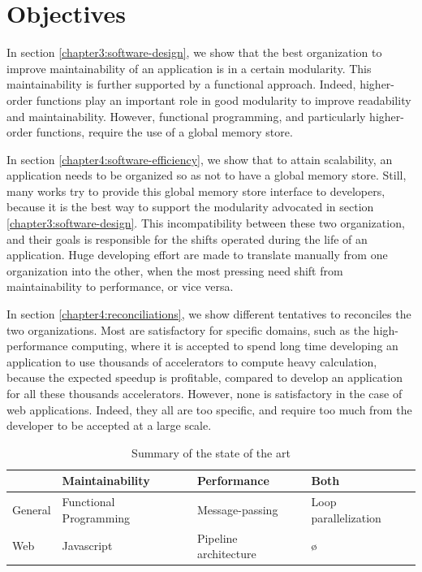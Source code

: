 \section{Objectives}


In section \ref{chapter3:software-design}, we show that the best organization to improve maintainability of an application is in a certain modularity.
This maintainability is further supported by a functional approach.
Indeed, higher-order functions play an important role in good modularity to improve readability and maintainability.
However, functional programming, and particularly higher-order functions, require the use of a global memory store.

In section \ref{chapter4:software-efficiency}, we show that to attain scalability, an application needs to be organized so as not to have a global memory store.
Still, many works try to provide this global memory store interface to developers, because it is the best way to support the modularity advocated in section \ref{chapter3:software-design}.
This incompatibility between these two organization, and their goals is responsible for the shifts operated during the life of an application.
Huge developing effort are made to translate manually from one organization into the other, when the most pressing need shift from maintainability to performance, or vice versa.

In section \ref{chapter4:reconciliations}, we show different tentatives to reconciles the two organizations.
Most are satisfactory for specific domains, such as the high-performance computing, where it is accepted to spend long time developing an application to use thousands of accelerators to compute heavy calculation, because the expected speedup is profitable, compared to develop an application for all these thousands accelerators.
However, none is satisfactory in the case of web applications.
Indeed, they all are too specific, and require too much from the developer to be accepted at a large scale.


\begin{table}
\begin{tabular}{l|l|l|l}
             & Maintainability         & Performance           & Both\\\hline
General      & Functional Programming  & Message-passing       & Loop parallelization\\
Web          & Javascript              & Pipeline architecture & ø
\end{tabular}
\caption{Summary of the state of the art}
\label{tab:chapter3:objectives:summary}
\end{table}

